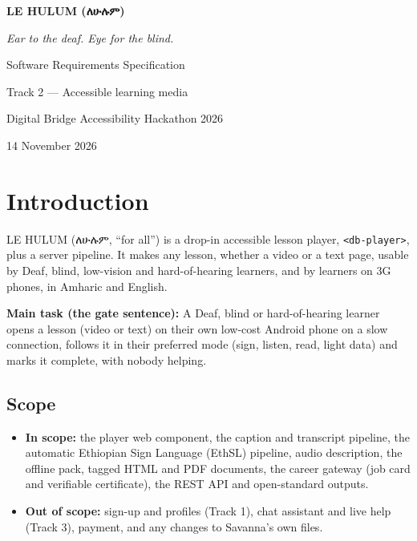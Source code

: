 \documentclass[11pt,a4paper]{article}
\newcommand{\am}[1]{{\ethfont #1}}
\newcommand{\code}[1]{\texttt{#1}}
\begin{document}
\begin{titlepage}
\centering
\vspace*{3cm}
{\Huge\bfseries LE HULUM (\am{ለሁሉም})\par}
\vspace{0.4cm}
{\Large\itshape Ear to the deaf. Eye for the blind.\par}
\vspace{1.2cm}
{\Large Software Requirements Specification\par}
\vspace{0.3cm}
{\large Track 2 --- Accessible learning media\par}
\vspace{0.3cm}
{\large Digital Bridge Accessibility Hackathon 2026\par}
\vfill
{\large 14 November 2026\par}
\vspace{1cm}
\end{titlepage}

\tableofcontents
\newpage

\section{Introduction}

LE HULUM (\am{ለሁሉም}, ``for all'') is a drop-in accessible lesson player, \code{<db-player>}, plus a server pipeline. It makes any lesson, whether a video or a text page, usable by Deaf, blind, low-vision and hard-of-hearing learners, and by learners on 3G phones, in Amharic and English.

\textbf{Main task (the gate sentence):} A Deaf, blind or hard-of-hearing learner opens a lesson (video or text) on their own low-cost Android phone on a slow connection, follows it in their preferred mode (sign, listen, read, light data) and marks it complete, with nobody helping.

\subsection{Scope}
\begin{itemize}
  \item \textbf{In scope:} the player web component, the caption and transcript pipeline, the automatic Ethiopian Sign Language (EthSL) pipeline, audio description, the offline pack, tagged HTML and PDF documents, the career gateway (job card and verifiable certificate), the REST API and open-standard outputs.
  \item \textbf{Out of scope:} sign-up and profiles (Track 1), chat assistant and live help (Track 3), payment, and any changes to Savanna's own files.
\end{itemize}
\end{document}
